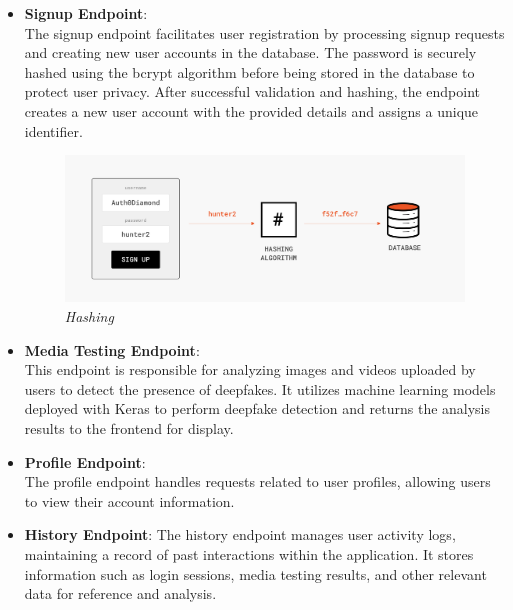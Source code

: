 \begin{itemize}
\begin{itemize}
              \item \textbf{Signup Endpoint}:\\
                    The signup endpoint facilitates user registration by processing signup requests and creating new user accounts in the database. The password is securely hashed using the bcrypt algorithm before being stored in the database to protect user privacy. After successful validation and hashing, the endpoint creates a new user account with the provided details and assigns a unique identifier.\\

                    \begin{figure}[htbp]
                        \centering
                        \includegraphics[width=5in]{img/example-of-hashing-during-signup.png}
                        \caption{\textit{Hashing}}
                    \end{figure}
                    \newpage
              \item \textbf{Media Testing Endpoint}:\\
                    This endpoint is responsible for analyzing images and videos uploaded by users to detect the presence of deepfakes. It utilizes machine learning models deployed with Keras to perform deepfake detection and returns the analysis results to the frontend for display.\\

              \item \textbf{Profile Endpoint}:\\
                    The profile endpoint handles requests related to user profiles, allowing users to view their account information.\\

              \item \textbf{History Endpoint}: The history endpoint manages user activity logs, maintaining a record of past interactions within the application. It stores information such as login sessions, media testing results, and other relevant data for reference and analysis.\\
          \end{itemize}


\end{itemize}
